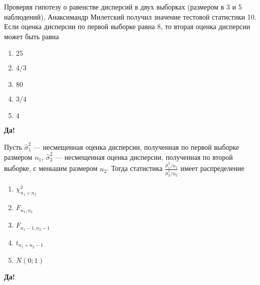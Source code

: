\documentclass[t]{beamer}
\begin{document}
 \begin{frame} \label{54-Yes} 
\begin{block}{54} 

Проверяя гипотезу о равенстве дисперсий в двух выборках (размером в 3 и 5 наблюдений), Анаксимандр Милетский получил значение тестовой статистики 10. Если оценка дисперсии по первой выборке равна 8, то вторая оценка дисперсии может быть равна
 


 \end{block} 
\begin{enumerate} 
\item[] \hyperlink{54-No}{\beamergotobutton{} $25$}
\item[] \hyperlink{54-No}{\beamergotobutton{} $4/3$}
\item[] \hyperlink{54-Yes}{\beamergotobutton{} $80$}
\item[] \hyperlink{54-No}{\beamergotobutton{} $3/4$}
\item[] \hyperlink{54-No}{\beamergotobutton{} $4$}
\end{enumerate} 

 \textbf{Да!} 
 \hyperlink{55}{}\end{frame} 


 \begin{frame} \label{55-Yes} 
\begin{block}{55} 

Пусть  $\hat{\sigma}^2_1$ — несмещенная оценка дисперсии, полученная по первой выборке размером $n_1$,   $\hat{\sigma}^2_2$ — несмещенная оценка дисперсии, полученная по второй выборке, с меньшим размером  $n_2$. Тогда статистика $\frac{\hat{\sigma}^2_1/n_1}{\hat{\sigma}^2_2/n_2}$  имеет распределение
 


 \end{block} 
\begin{enumerate} 
\item[] \hyperlink{55-No}{\beamergotobutton{} $\chi^2_{n_1+n_2}$}
\item[] \hyperlink{55-No}{\beamergotobutton{} $F_{n_1,n_2}$}
\item[] \hyperlink{55-No}{\beamergotobutton{} $F_{n_1-1,n_2-1}$}
\item[] \hyperlink{55-No}{\beamergotobutton{} $t_{n_1+n_2-1}$}
\item[] \hyperlink{55-No}{\beamergotobutton{} $N(0;1)$}
\end{enumerate} 

 \textbf{Да!} 
 \hyperlink{56}{}\end{frame} 
\end{document}
